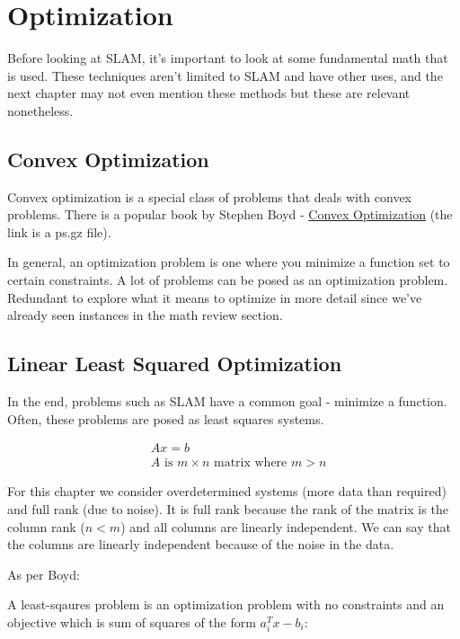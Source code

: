 \chapter{Optimization}

Before looking at SLAM, it's important to look at some fundamental math that is used. These techniques aren't limited to SLAM and have other uses, and the next chapter may not even mention these methods but these are relevant nonetheless. 

\section{Convex Optimization}

Convex optimization is a special class of problems that deals with convex problems. There is a popular book by Stephen Boyd - \href{http://93.174.95.29/main/B8624D493F5332A34A826B9CC74B88B1}{Convex Optimization} (the link is a ps.gz file). 

In general, an optimization problem is one where you minimize a function set to certain constraints. A lot of problems can be posed as an optimization problem. Redundant to explore what it means to optimize in more detail since we've already seen instances in the math review section. 

\section{Linear Least Squared Optimization}

In the end, problems such as SLAM have a common goal - minimize a function. Often, these problems are posed as least squares systems.

\begin{equation}
\begin{split}
    &Ax=b \\
    &A\text{ is }m\times n \text{ matrix where } m > n
\end{split}
\end{equation}

For this chapter we consider overdetermined systems (more data than required) and full rank (due to noise). It is full rank because the rank of the matrix is the column rank ($n < m$) and all columns are linearly independent. We can say that the columns are linearly independent because of the noise in the data.

As per Boyd:

A least-sqaures problem is an optimization problem with no constraints and an objective which is sum of squares of the form $a_i^Tx-b_i$:

